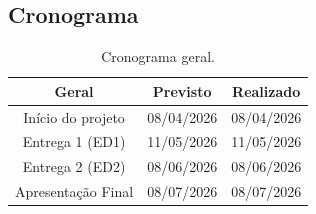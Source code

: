 \begin{landscape}

\chapter{Cronograma} 
\label{crono}

\begin{table}[htpb]
\footnotesize
\centering
\begin{center}
\caption{Cronograma geral.}
\begin{tabular}{|c|c|c|}
\hline
\textbf{Geral} & \textbf{Previsto} & \textbf{Realizado} \\ \hline
Início do projeto & 08/04/2026 & 08/04/2026 \\ \hline
Entrega 1 (ED1)   & 11/05/2026 & 11/05/2026 \\ \hline
Entrega 2 (ED2)   & 08/06/2026 & 08/06/2026 \\ \hline
Apresentação Final& 08/07/2026 & 08/07/2026 \\ \hline
\end{tabular}
\end{center}
\end{table}

\newpage

\begin{table}[htpb]
\begin{center}
\caption{Cronograma por atividade.}

\end{center}
\end{table}
\end{landscape}
